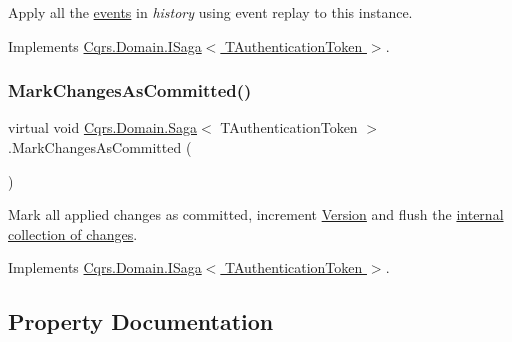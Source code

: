 Apply all the \hyperlink{}{events} in {\itshape history}  using event replay to this instance. 



Implements \hyperlink{interfaceCqrs_1_1Domain_1_1ISaga_a2714804684bc65cf4dec79b4697b9b21_a2714804684bc65cf4dec79b4697b9b21}{Cqrs.\+Domain.\+I\+Saga$<$ T\+Authentication\+Token $>$}.

\mbox{\label{classCqrs_1_1Domain_1_1Saga_a9caac842ea6e88d6e502b63ca1820fe4_a9caac842ea6e88d6e502b63ca1820fe4}} 
\subsubsection{\texorpdfstring{Mark\+Changes\+As\+Committed()}{MarkChangesAsCommitted()}}
{\footnotesize\ttfamily virtual void \hyperlink{classCqrs_1_1Domain_1_1Saga}{Cqrs.\+Domain.\+Saga}$<$ T\+Authentication\+Token $>$.Mark\+Changes\+As\+Committed (\begin{DoxyParamCaption}{ }\end{DoxyParamCaption})\hspace{0.3cm}{\ttfamily [virtual]}}



Mark all applied changes as committed, increment \hyperlink{classCqrs_1_1Domain_1_1Saga_a581e88da4e3e76d3704586f97866a7a6_a581e88da4e3e76d3704586f97866a7a6}{Version} and flush the \hyperlink{}{internal collection of changes}. 



Implements \hyperlink{interfaceCqrs_1_1Domain_1_1ISaga_a85c75f80bc5be4bad7f1d9f1231bfba7_a85c75f80bc5be4bad7f1d9f1231bfba7}{Cqrs.\+Domain.\+I\+Saga$<$ T\+Authentication\+Token $>$}.



\subsection{Property Documentation}
\mbox{\label{classCqrs_1_1Domain_1_1Saga_a944fc264b716dcd60a2e51c9897766fa_a944fc264b716dcd60a2e51c9897766fa}} 

